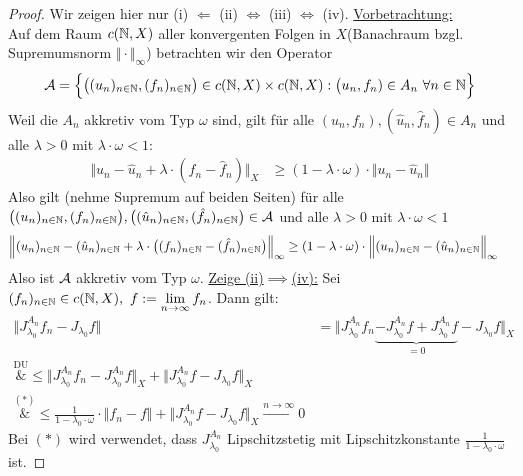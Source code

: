 \begin{proof}
	Wir zeigen hier nur (i) $\Longleftarrow$ (ii) $\Longleftrightarrow$ (iii) $\Longleftrightarrow$ (iv).\nl
	\underline{Vorbetrachtung:}\\
	Auf dem Raum $c(\mathbb{N},X)$ aller konvergenten Folgen in $X$(Banachraum  bzgl. Supremumsnorm $\Vert\cdot\Vert_\infty$) betrachten wir den Operator
	\begin{align*}
		\mathcal{A}=\Big\lbrace\big((u_n)_{n\in\mathbb{N}},(f_n)_{n\in\mathbb{N}}\big)\in c(\mathbb{N},X)\times c(\mathbb{N},X):\big(u_n,f_n)\in A_n~\forall n\in\mathbb{N}\Big\rbrace
	\end{align*}	 
	Weil die $A_n$ akkretiv vom Typ $\omega$ sind, gilt für alle $(u_n,f_n),(\hat{u}_n,\hat{f}_n)\in A_n$ und alle $\lambda>0$ mit $\lambda\cdot\omega<1$:
	\begin{align*}
		\Big\Vert u_n-\hat{u}_n+\lambda\cdot(f_n-\hat{f}_n)\Big\Vert_X
		&\geq(1-\lambda\cdot\omega)\cdot\big\Vert u_n-\hat{u}_n\big\Vert
	\end{align*}
	Also gilt (nehme Supremum auf beiden Seiten) für alle\\ $\big((u_n)_{n\in\mathbb{N}},(f_n)_{n\in\mathbb{N}}\big),\big((\hat{u}_n)_{n\in\mathbb{N}},(\hat{f}_n)_{n\in\mathbb{N}}\big)\in\mathcal{A}$ und alle $\lambda>0$ mit $\lambda\cdot\omega<1$
	\begin{align*}
		\Big\Vert(u_n)_{n\in\mathbb{N}}-(\hat{u}_n)_{n\in\mathbb{N}}+\lambda\cdot\big((f_n)_{n\in\mathbb{N}}-(\hat{f}_n)_{n\in\mathbb{N}}\big)\Big\Vert_\infty
		&\geq(1-\lambda\cdot\omega)\cdot\Big\Vert(u_n)_{n\in\mathbb{N}}-(\hat{u}_n)_{n\in\mathbb{N}}\Big\Vert_\infty
	\end{align*}
	Also ist $\mathcal{A}$ akkretiv vom Typ $\omega$.\nl
	\underline{Zeige (ii)$\implies$(iv):}
	Sei $(f_n)_{n\in\mathbb{N}}\in c(\mathbb{N},X),~f:=\lim\limits_{n\to\infty} f_n$. Dann gilt:
	\begin{align*}
		\Big\Vert J_{\lambda_0}^{A_n} f_n-J_{\lambda_0} f\Big\Vert
		&=\Big\Vert J_{\lambda_0}^{A_n} f_n\underbrace{-J_{\lambda_0}^{A_n} f+J_{\lambda_0}^{A_n} f}_{=0}-J_{\lambda_0} f\Big\Vert_X\\
		\overset{\text{DU}}&\leq
		\Big\Vert J_{\lambda_0}^{A_n} f_n-J_{\lambda_0}^{A_n} f\Big\Vert_X+\Big\Vert J_{\lambda_0}^{A_n} f-J_{\lambda_0} f\Big\Vert_X\\
		\overset{(\ast)}&\leq
		\frac{1}{1-\lambda_0\cdot\omega}\cdot\big\Vert f_n-f\big\Vert+\Big\Vert J_{\lambda_0}^{A_n} f-J_{\lambda_0}f\Big\Vert_X\stackrel{n\to\infty}{\longrightarrow} 0
	\end{align*}
	Bei $(\ast)$ wird verwendet, dass $J_{\lambda_0}^{A_n}$ Lipschitzstetig mit Lipschitzkonstante $\frac{1}{1-\lambda_0\cdot\omega}$ ist. 

\end{proof}
